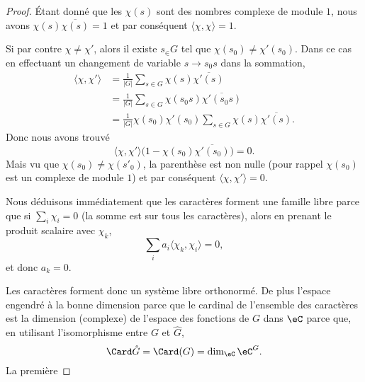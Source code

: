 \begin{proof}
	Étant donné que les \( \chi(s)\) sont des nombres complexe de module \( 1\), nous avons \( \chi(s)\overline{ \chi(s) }=1\) et par conséquent \( \langle \chi, \chi\rangle =1\).

	Si par contre \( \chi\neq\chi'\), alors il existe \( s_\in G\) tel que \( \chi(s_0)\neq \chi'(s_0)\). Dans ce cas en effectuant un changement de variable \( s\to s_0s\) dans la sommation,
	\begin{subequations}
		\begin{align}
			\langle \chi, \chi'\rangle & =\frac{1}{ | G | }\sum_{s\in G}\chi(s)\overline{ \chi'(s) }                     \\
			                           & =\frac{1}{ | G | }\sum_{s\in G}\chi(s_0s)\overline{ \chi'(s_0s) }               \\
			                           & =\frac{1}{ | G | }\chi(s_0)\chi'(s_0)\sum_{s\in G}\chi(s)\overline{ \chi'(s) }.
		\end{align}
	\end{subequations}
	Donc nous avons trouvé
	\begin{equation}
		\langle \chi, \chi'\rangle \big( 1-\chi(s_0)\overline{ \chi'(s_0) } \big)=0.
	\end{equation}
	Mais vu que \( \chi(s_0)\neq \chi(s'_0)\), la parenthèse est non nulle (pour rappel \( \chi(s_0)\) est un complexe de module \( 1\)) et par conséquent \( \langle \chi, \chi'\rangle =0\).

	Nous déduisons immédiatement que les caractères forment une famille libre parce que si \( \sum_i\chi_i=0\) (la somme est sur tous les caractères), alors en prenant le produit scalaire avec \( \chi_k\),
	\begin{equation}
		\sum_ia_i\langle \chi_k, \chi_i\rangle =0,
	\end{equation}
	et donc \( a_k=0\).

	Les caractères forment donc un système libre orthonormé. De plus l'espace engendré à la bonne dimension parce que le cardinal de l'ensemble des caractères est la dimension (complexe) de l'espace des fonctions de \( G\) dans \( \eC\) parce que, en utilisant l'isomorphisme entre \( G\) et \( \hat G\),
	\begin{equation}
		\Card\hat G=\Card(G)=\dim_{\eC}\eC^G.
	\end{equation}
	La première
\end{proof}

